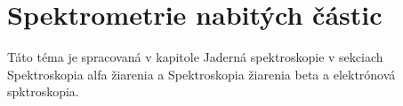 \documentclass[../../main.tex]{subfiles}
\begin{document}
\section{Spektrometrie nabitých částic}

Táto téma je spracovaná v kapitole Jaderná spektroskopie v sekciach Spektroskopia alfa žiarenia a Spektroskopia žiarenia beta a elektrónová spktroskopia.
\end{document}
